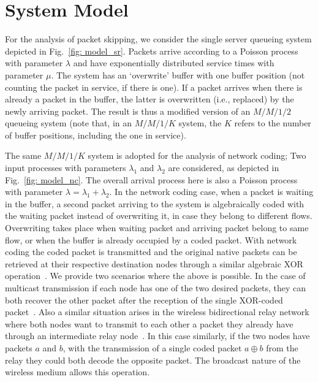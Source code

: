 \documentclass[preprint,12pt]{elsarticle}
\theoremstyle{definition}
\theoremstyle{plain}
\theoremstyle{remark}
\begin{document}
\section{System Model} \label{section:system-model}
For the analysis of packet skipping, we consider the single server queueing system depicted in Fig.~\ref{fig: model_sr}.
Packets arrive according to a Poisson process with parameter $\lambda$ and have exponentially distributed service times with parameter $\mu$.
The system has an `overwrite' buffer with one buffer position (not counting the packet in service, if there is one). If a packet arrives when there is already a packet in the buffer, the latter is overwritten (i.e., replaced) by the newly arriving packet. The result is thus a modified version of an $M/M/1/2$ queueing system (note that, in an $M/M/1/K$ system, the $K$ refers to the number of buffer positions, including the one in service).

The same $M/M/1/K$ system is adopted for the analysis of network coding; Two input processes with parameters $\lambda_1$ and $\lambda_2$ are considered, as depicted in Fig.~\ref{fig: model_nc}. The overall arrival process here is also a Poisson process with parameter $\lambda = \lambda_1 + \lambda_2$.
In the network coding case, when a packet is waiting in the buffer, a second packet arriving to the system is algebraically coded with the waiting packet instead of overwriting it, in case they belong to different flows. Overwriting takes place when waiting packet and arriving packet belong to same flow, or when the buffer is already occupied by a coded packet. With network coding the coded packet is transmitted and the original native packets can be retrieved at their respective destination nodes through a similar algebraic XOR operation~\cite{ahlswede:network-coding}. We provide two scenarios where the above is possible. In the case of multicast transmission if each node has one of the two desired packets, they can both recover the other packet after the reception of the single XOR-coded packet~\cite{ahlswede:network-coding}. Also a similar situation arises in the wireless bidirectional relay network where both nodes want to transmit to each other a packet they already have through an intermediate relay node~\cite{aoun-ewsn2011}. In this case similarly, if the two nodes have packets $a$ and $b$, with the transmission of a single coded packet $a\oplus b$ from the relay they could both decode the opposite packet. The broadcast nature of the wireless medium allows this operation.
\end{document}
